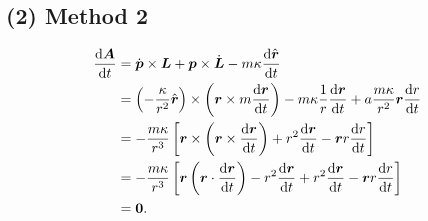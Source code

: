 \subsection*{(2) Method 2}\label{method-2}

\begin{align*}
    \dfrac{\mathrm d \boldsymbol A}{\mathrm dt} & = \dot {\boldsymbol p} \times \boldsymbol L + \boldsymbol p \times \dot {\boldsymbol L} - m \kappa \dfrac{\mathrm d \hat {\boldsymbol r}}{\mathrm dt} \\
    & = \left(- {\kappa \over r^2} \hat {\boldsymbol r} \right) \times \left( \boldsymbol r \times m {\mathrm d \boldsymbol r \over \mathrm dt} \right) - m \kappa {1 \over r} {\mathrm d \boldsymbol r \over \mathrm dt} +a {m \kappa \over r^2} \boldsymbol r {\mathrm dr \over \mathrm dt} \\
    & = - {m \kappa \over r^3} \left[ \boldsymbol r \times \left( \boldsymbol r \times {\mathrm d \boldsymbol r \over \mathrm dt} \right) + r^2 {\mathrm d \boldsymbol r \over \mathrm dt} - \boldsymbol r r {\mathrm d r \over \mathrm dt} \right]\\
    & = - {m \kappa \over r^3}\left[ \boldsymbol r \left( \boldsymbol r \cdot {\mathrm d \boldsymbol r \over \mathrm dt} \right) - r^2 {\mathrm d \boldsymbol r \over \mathrm dt} + r^2 {\mathrm d \boldsymbol r \over \mathrm dt} - \boldsymbol r r {\mathrm d r \over \mathrm dt} \right]\\
    & = \boldsymbol 0.
\end{align*}
